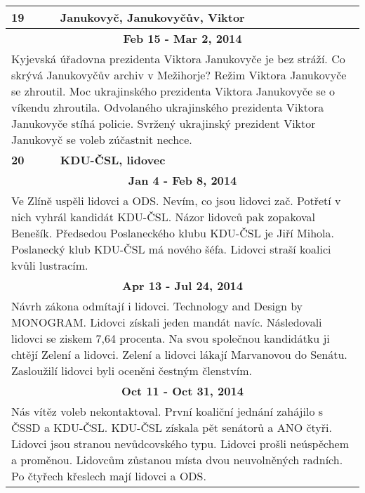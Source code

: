\begin{tabularx}{\linewidth}{l l}
\bf 19 & \bf Janukovyč, Janukovyčův, Viktor \\ \midrule
\multicolumn{2}{c}{\bf Feb 15 - Mar 2, 2014} \\
\multicolumn{2}{p{\linewidth}}{Kyjevská úřadovna prezidenta Viktora Janukovyče je bez stráží. Co skrývá Janukovyčův archiv v Mežihorje? Režim Viktora Janukovyče se zhroutil. Moc ukrajinského prezidenta Viktora Janukovyče se o víkendu zhroutila. Odvolaného ukrajinského prezidenta Viktora Janukovyče stíhá policie. Svržený ukrajinský prezident Viktor Janukovyč se voleb zúčastnit nechce.} \\ \midrule[1.5pt]

\bf 20 & \bf KDU-ČSL, lidovec \\ \midrule
\multicolumn{2}{c}{\bf Jan 4 - Feb 8, 2014} \\
\multicolumn{2}{p{\linewidth}}{Ve Zlíně uspěli lidovci a ODS. Nevím, co jsou lidovci zač. Potřetí v nich vyhrál kandidát KDU-ČSL. Názor lidovců pak zopakoval Benešík. Předsedou Poslaneckého klubu KDU-ČSL je Jiří Mihola. Poslanecký klub KDU-ČSL má nového šéfa. Lidovci straší koalici kvůli lustracím.} \\ \midrule
\multicolumn{2}{c}{\bf Apr 13 - Jul 24, 2014} \\
\multicolumn{2}{p{\linewidth}}{Návrh zákona odmítají i lidovci. Technology and Design by MONOGRAM. Lidovci získali jeden mandát navíc. Následovali lidovci se ziskem 7,64 procenta. Na svou společnou kandidátku ji chtějí Zelení a lidovci. Zelení a lidovci lákají Marvanovou do Senátu. Zasloužilí lidovci byli oceněni čestným členstvím.} \\ \midrule
\multicolumn{2}{c}{\bf Oct 11 - Oct 31, 2014} \\
\multicolumn{2}{p{\linewidth}}{Nás vítěz voleb nekontaktoval. První koaliční jednání zahájilo s ČSSD a KDU-ČSL. KDU-ČSL získala pět senátorů a ANO čtyři. Lidovci jsou stranou nevůdcovského typu. Lidovci prošli neúspěchem a proměnou. Lidovcům zůstanou místa dvou neuvolněných radních. Po čtyřech křeslech mají lidovci a ODS.} \\ \midrule[1.5pt]


\end{tabularx}
